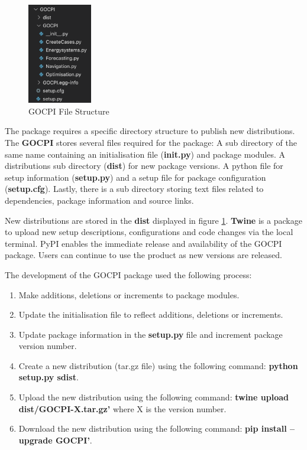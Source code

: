 \documentclass[12pt]{article}
\begin{document}
\begin{figure}
	\centering
	\includegraphics[width = 0.25\textwidth]{GOCPI-package-structure}
	\caption{GOCPI File Structure}
	\label{fig:GPS}
\end{figure}

The package requires a specific directory structure to publish new distributions.
The \textbf{GOCPI} stores several files required for the package: 
A sub directory of the same name containing an initialisation file (\textbf{init.py}) and package modules. 
A distributions sub directory (\textbf{dist}) for new package versions. 
A python file for setup information (\textbf{setup.py}) and a setup file for package configuration (\textbf{setup.cfg}).
Lastly, there is a sub directory storing text files related to dependencies, package information and source links.

New distributions are stored in the \textbf{dist} displayed in figure \ref{fig:GPS}.
\textbf{Twine} is a package to upload new setup descriptions, configurations and code changes via the local terminal.
PyPI enables the immediate release and availability of the GOCPI package.
Users can continue to use the product as new versions are released.

The development of the GOCPI package used the following process:
\begin{enumerate}
	\item Make additions, deletions or increments to package modules.
	\item Update the initialisation file to reflect additions, deletions or increments.
	\item Update package information in the \textbf{setup.py} file and increment package version number.
	\item Create a new distribution (tar.gz file) using the following command: \textbf{python setup.py sdist}.
	\item Upload the new distribution using the following command: \textbf{twine upload dist/GOCPI-X.tar.gz'} where X is the version number.
	\item Download the new distribution using the following command: \textbf{pip install --upgrade GOCPI'}.
\end{enumerate}
\end{document}
